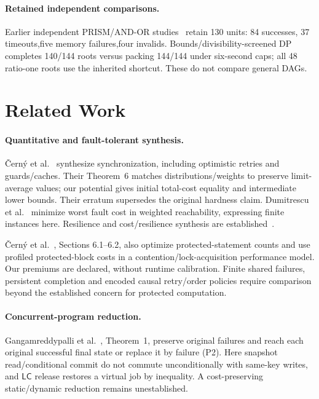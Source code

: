 \documentclass[acmsmall,screen,review,anonymous]{acmart}
\newcommand{\LC}{\mathsf{LC}}
\begin{document}
\paragraph{Retained independent comparisons.}
Earlier independent PRISM/AND-OR studies~\cite{prism} retain 130 units: 84 successes, 37 timeouts,five memory failures,four invalids. Bounds/divisibility-screened DP completes 140/144 roots versus packing 144/144 under six-second caps; all 48 ratio-one roots use the inherited shortcut. These do not compare general DAGs.

\section{Related Work}

\paragraph{Quantitative and fault-tolerant synthesis.}
\v{C}ern\'y et al.~\cite{cerny} synthesize synchronization, including optimistic retries and guards/caches. Their Theorem~6 matches distributions/weights to preserve limit-average values; our potential gives initial total-cost equality and intermediate lower bounds. Their erratum supersedes the original hardness claim. Dumitrescu et al.~\cite{dumitrescu} minimize worst fault cost in weighted reachability, expressing finite instances here. Resilience and cost/resilience synthesis are established~\cite{neider,weinert}.

\v{C}ern\'y et al.~\cite{cernyquality}, Sections 6.1--6.2, also optimize protected-statement counts and use profiled protected-block costs in a contention/lock-acquisition performance model. Our premiums are declared, without runtime calibration. Finite shared failures, persistent completion and encoded causal retry/order policies require comparison beyond the established concern for protected computation.

\paragraph{Concurrent-program reduction.}
Gangamreddypalli et al.~\cite{structured}, Theorem~1, preserve original failures and reach each original successful final state or replace it by failure (P2). Here snapshot read/conditional commit do not commute unconditionally with same-key writes, and $\LC$ release restores a virtual job by inequality. A cost-preserving static/dynamic reduction remains unestablished.
\end{document}
